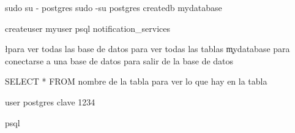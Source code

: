sudo su - postgres
sudo -su postgres
createdb mydatabase

createuser myuser
psql notification_services

\l para ver todas las base de datos
\dt para ver todas las tablas
\c mydatabase para conectarse a una base de datos
\q para salir de la base de datos

SELECT * FROM nombre de la tabla para ver lo que hay en la tabla

user postgres clave 1234

psql

